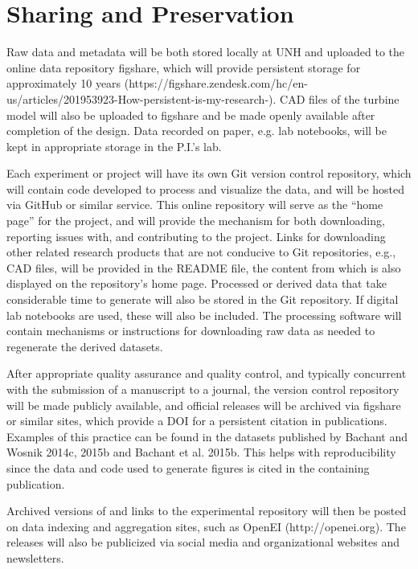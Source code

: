 \section{Sharing and Preservation}

Raw data and metadata will be both stored locally at UNH and uploaded to the
online data repository figshare, which will provide persistent storage for
approximately 10 years
(https://figshare.zendesk.com/hc/en-us/articles/201953923-How-persistent-is-my-research-). CAD files of the turbine model will also be uploaded to figshare and be made openly available after completion of the design. Data recorded on paper, e.g. lab notebooks, will be kept in appropriate storage in the P.I.'s lab.

Each experiment or project will have its own Git version control repository,
which will contain code developed to process and visualize the data, and will be
hosted via GitHub or similar service. This online repository will serve as the
``home page'' for the project, and will provide the mechanism for both
downloading, reporting issues with, and contributing to the project. Links for
downloading other related research products that are not conducive to Git
repositories, e.g., CAD files, will be provided in the README file, the content
from which is also displayed on the repository's home page. Processed or derived
data that take considerable time to generate will also be stored in the Git
repository. If digital lab notebooks are used, these will also be included. The
processing software will contain mechanisms or instructions for downloading raw
data as needed to regenerate the derived datasets.

After appropriate quality assurance and quality control, and typically
concurrent with the submission of a manuscript to a journal, the version control
repository will be made publicly available, and official releases will be
archived via figshare or similar sites, which provide a DOI for a persistent
citation in publications. Examples of this practice can be found in the datasets
published by Bachant and Wosnik 2014c, 2015b and Bachant et al. 2015b. This
helps with reproducibility since the data and code used to generate figures is
cited in the containing publication.

Archived versions of and links to the experimental repository will then be
posted on data indexing and aggregation sites, such as OpenEI
(http://openei.org). The releases will also be publicized via social media and
organizational websites and newsletters.
